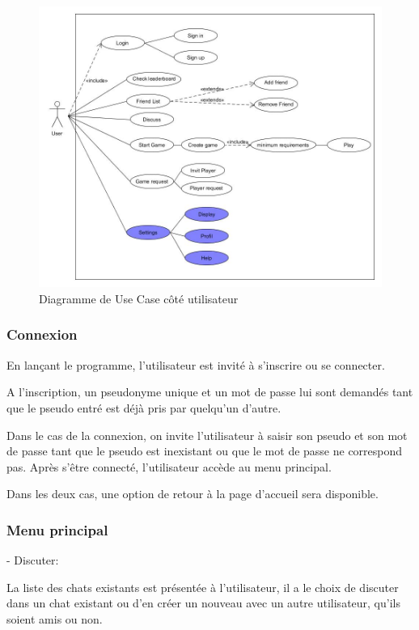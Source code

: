 \documentclass[a4paper,12pt]{article}
\begin{document}
\begin{figure}[h!]
\centering
\includegraphics[width=15cm]{images/UserUseCase.jpg}
\caption{Diagramme de Use Case côté utilisateur}
\label{fig:UserUseCase}
\end{figure}

\subsubsection{Connexion}
En lançant le programme, l'utilisateur est invité à s'inscrire ou se connecter.

A l'inscription, un pseudonyme unique et un mot de passe lui sont demandés tant que le pseudo entré est déjà pris par quelqu'un d'autre.

Dans le cas de la connexion, on invite l'utilisateur à saisir son pseudo et son mot de passe tant que le pseudo est inexistant ou que le mot de passe ne correspond pas. Après s’être connecté, l'utilisateur accède au menu principal.

Dans les deux cas, une option de retour à la page d'accueil sera disponible.

\subsubsection{Menu principal}

- Discuter:

La liste des chats existants est présentée à l'utilisateur, il a le choix de discuter dans un chat existant ou d'en créer un nouveau avec un autre utilisateur, qu'ils soient amis ou non. 
\end{document}
